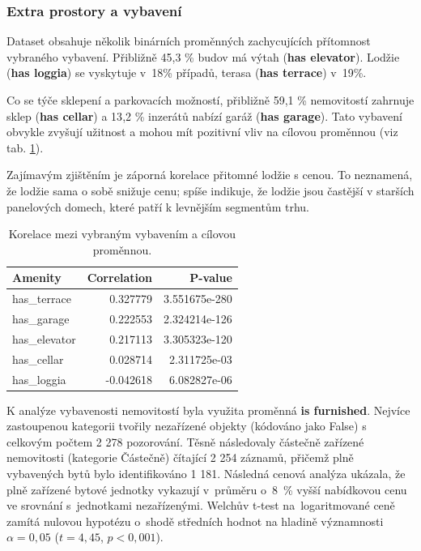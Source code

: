 \subsubsection*{Extra prostory a vybavení}
Dataset obsahuje několik binárních proměnných zachycujících přítomnost vybraného vybavení. Přibližně 45{,}3 \% budov má výtah (\textbf{has elevator}). Lodžie (\textbf{has loggia}) se vyskytuje v~18\% případů, terasa (\textbf{has terrace}) v~19\%.

Co se týče sklepení a parkovacích možností, přibližně 59{,}1 \% nemovitostí zahrnuje sklep (\textbf{has cellar}) a 13{,}2 \% inzerátů nabízí garáž (\textbf{has garage}). Tato vybavení obvykle zvyšují užitnost a mohou mít pozitivní vliv na cílovou proměnnou (viz tab. \ref{tab:amenity_correlation}).

Zajímavým zjištěním je záporná korelace přitomné lodžie s cenou. To neznamená, že lodžie sama o sobě snižuje cenu; spíše indikuje, že lodžie jsou častější v starších panelových domech, které patří k levnějším segmentům trhu.

\begin{table}[h]
\caption{Korelace mezi vybraným vybavením a cílovou proměnnou.}
\centering
\begin{tabular}{lrr}
\hline
Amenity & Correlation & P-value \\
\hline
has\_terrace  & 0.327779  & 3.551675e-280 \\
has\_garage   & 0.222553  & 2.324214e-126 \\
has\_elevator & 0.217113  & 3.305323e-120 \\
has\_cellar   & 0.028714  & 2.311725e-03 \\
has\_loggia   & -0.042618 & 6.082827e-06 \\
\hline
\end{tabular}

\label{tab:amenity_correlation}
\end{table}

K analýze vybavenosti nemovitostí byla využita proměnná \textbf{is furnished}. Nejvíce zastoupenou kategorii tvořily nezařízené objekty (kódováno jako False) s celkovým počtem 2 278 pozorování. Těsně následovaly částečně zařízené nemovitosti (kategorie Částečně) čítající 2 254 záznamů, přičemž plně vybavených bytů bylo identifikováno 1 181. Následná cenová analýza ukázala, že plně zařízené bytové jednotky vykazují v~průměru o~8~\% vyšší nabídkovou cenu ve srovnání s~jednotkami nezařízenými. Welchův t-test na~logaritmované ceně zamítá nulovou hypotézu o~shodě středních hodnot na hladině významnosti $\alpha = 0{,}05$ ($t = 4{,}45$, $p < 0{,}001$).

